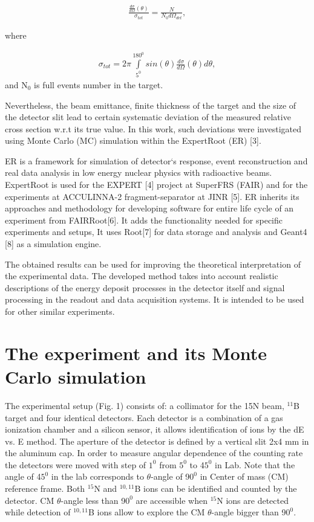 \documentclass[%
 aip,
cp,  %
 amsmath,amssymb,%
 reprint,%
]{revtex4-2}
\begin{document}
\begin{eqnarray}
 \frac{ \frac{d\sigma}{d\Omega}(\theta) }{\sigma_{tot}} = \frac{N}{N_0 d\Omega_{det}},
\end{eqnarray}

where

\begin{eqnarray}
  \sigma_{tot} = 2\pi \int\limits_{5^{0}}^{180^{0}} sin(\theta)\frac{d\sigma}{d\Omega}(\theta)d\theta,
 \end{eqnarray}
and N$_{0}$ is full events number in the target.

Nevertheless, the beam emittance, finite thickness of the target and the size of the detector slit lead to certain systematic deviation of the measured relative cross section w.r.t its true value. In this work, such deviations were investigated using Monte Carlo (MC) simulation within the ExpertRoot (ER) [3].

ER is a framework for simulation of detector`s response, event reconstruction and real data analysis in low energy nuclear physics with radioactive beams. ExpertRoot is used for the EXPERT [4] project at SuperFRS (FAIR) and for the experiments at ACCULINNA-2 fragment-separator at JINR [5].  ER inherits its approaches and methodology for developing software for entire life cycle of an experiment from FAIRRoot[6]. It adds the functionality needed for specific experiments and setups, It uses Root[7] for data storage and analysis and Geant4 [8] as a simulation engine.

The obtained results can be used for improving the theoretical interpretation of the experimental data. The developed method takes into account realistic descriptions of the energy deposit processes in the detector itself and signal processing in the readout and data acquisition systems. It is intended to be used for other similar experiments.

\section{The experiment and its Monte Carlo simulation}

The experimental setup (Fig. 1) consists of: a collimator for the 15N beam, ${}^{11}$B target and four identical detectors. Each detector is a combination of a gas ionization chamber and a silicon sensor, it allows identification of ions by the dE vs. E method. The aperture of the detector is defined by a vertical slit 2x4 mm in the aluminum cap. In order to measure angular dependence of the counting rate the detectors were moved with step of $1^0$  from $5^0$ to 4$5^0$ in Lab. Note that the angle of 4$5^0$ in the lab corresponds to $\theta$-angle of 9$0^0$  in Center of mass (CM) reference frame. Both ${}^{15}$N and ${}^{10,11}$B ions can be identified and counted by the detector. CM $\theta$-angle less than 9$0^0$  are accessible when ${}^{15}$N ions are detected while detection of ${}^{10,11}$B ions allow to explore the CM $\theta$-angle bigger than 9$0^0$.
\end{document}
